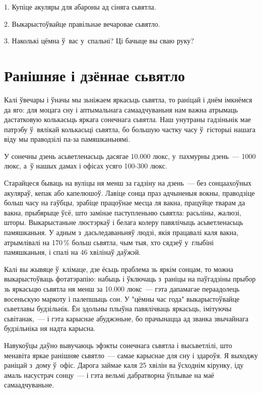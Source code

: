 1. Купіце акуляры для абароны ад сіняга сьвятла.

2. Выкарыстоўвайце правільнае вечаровае сьвятло.

3. Наколькі цёмна ў~вас у~спальні? Ці бачыце вы сваю руку?


\section{Ранішняе і дзённае сьвятло}

Калі ўвечары і ўначы мы зьніжаем яркасьць сьвятла, то раніцай і днём імкнёмся да яго: для моцага сну і аптымальнага самаадчуваньня нам важна атрымаць дастатковую колькасьць яркага сонечнага сьвятла. Наш унутраны гадзіньнік мае патрэбу ў~вялікай колькасьці сьвятла, бо большую частку часу ў~гісторыі нашага віду мы праводзілі па-за памяшканьнямі.

У сонечны дзень асьветленасьць дасягае 10.000 люкс, у~пахмурны дзень~--- 1000 люкс, а~ў нашых дамах і офісах усяго 100-300 люкс.

Старайцеся бываць на вуліцы ня менш за гадзіну на дзень~--- без сонцаахоўных акуляраў, кепак або капелюшоў. Лавіце сонца праз адчыненыя вокны, праводзіце больш часу на гаўбцы, зрабіце працоўнае месца ля вакна, працуйце тварам да вакна, прыбярыце ўсё, што замінае паступленьню сьвятла: расьліны, жалюзі, шторы. Выкарыстаньне люстэркаў і белага колеру павялічыць асьветленасьць памяшканьня. У адным з~дасьледаваньняў людзі, якія працавалі каля вакна, атрымлівалі на 170\,\% больш сьвятла, чым тыя, хто сядзеў у~глыбіні памяшканьня, і спалі на 46 хвілінаў даўжэй.

Калі вы жывяце ў~клімаце, дзе ёсьць праблема зь яркім сонцам, то можна выкарыстоўваць фотатэрапію: набыць і ўключаць з~раніцы на паўгадзіны прыбор зь яркасьцю сьвятла ня менш за 10.000 люкс~--- гэта дапамагае пераадолець восеньскую маркоту і палепшыць сон. У "цёмны час года" выкарыстоўвайце сьветлавы будзільнік. Ён здольны плыўна павялічваць яркасьць, імітуючы сьвітанак,~--- і гэта карыснае абуджэньне, бо прачынацца ад званка звычайнага будзільніка ня надта карысна.

Навукоўцы даўно вывучаюць эфэкты сонечнага сьвятла і высьветлілі, што менавіта яркае ранішняе сьвятло~--- самае карыснае для сну і здароўя. Я выходжу раніцай з~дому ў~офіс. Дарога займае каля 25 хвілін ва ўсходнім кірунку, іду амаль насустрач сонцу~--- і гэта вельмі дабратворна ўплывае на маё самаадчуваньне.

